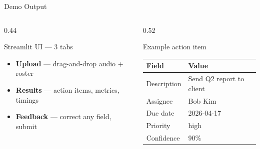\documentclass[aspectratio=169]{beamer}
\begin{document}
\begin{frame}{Demo Output}
  \begin{columns}[T,onlytextwidth]
    \begin{column}{0.44\textwidth}
      \begin{block}{Streamlit UI --- 3 tabs}
        \begin{itemize}
          \item \textbf{Upload} --- drag-and-drop audio + roster
          \item \textbf{Results} --- action items, metrics, timings
          \item \textbf{Feedback} --- correct any field, submit
        \end{itemize}
      \end{block}
    \end{column}
    \begin{column}{0.52\textwidth}
      \begin{block}{Example action item}
        \begin{tabular}{@{}ll@{}}
          \toprule
          Field & Value \\
          \midrule
          Description & Send Q2 report to client \\
          Assignee    & Bob Kim \\
          Due date    & 2026-04-17 \\
          Priority    & high \\
          Confidence  & 90\% \\
          \bottomrule
        \end{tabular}
      \end{block}
    \end{column}
  \end{columns}
\end{frame}
\end{document}
